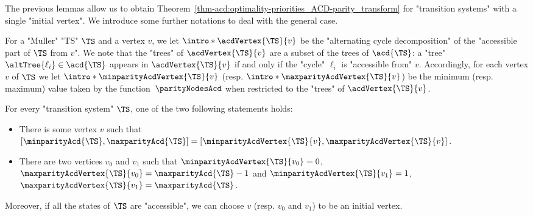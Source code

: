 \documentclass{theoretics}
\begin{document}
The previous lemmas allow us to obtain Theorem~\ref{thm-acd:optimality-priorities_ACD-parity_transform} for "transition systems" with a single "initial vertex". We introduce some further notations to deal with the general case.

\AP For a "Muller" "TS" $\TS$ and a vertex $v$, we let $\intro*\acdVertex{\TS}{v}$ be the "alternating cycle decomposition" of the "accessible part of $\TS$ from $v$". We note that the "trees" of $\acdVertex{\TS}{v}$ are a subset of the trees of $\acd{\TS}$: a "tree" $\altTree{\ell_i}\in \acd{\TS}$ appears in $\acdVertex{\TS}{v}$ if and only if the "cycle" $\ell_i$ is "accessible from" $v$.
\AP Accordingly, for each vertex $v$ of $\TS$ we let $\intro*\minparityAcdVertex{\TS}{v}$ (resp. $\intro*\maxparityAcdVertex{\TS}{v}$) be the minimum (resp. maximum) value taken by the function~$\parityNodesAcd$ when restricted to the "trees" of $\acdVertex{\TS}{v}$.

\begin{remark}\label{rmk-acd:priorities-accessible-from-vertex}
	For every "transition system" $\TS$, one of the two following statements holds:
	\begin{itemize}
		\item There is some vertex $v$ such that $[\minparityAcd{\TS}, \maxparityAcd{\TS}] = [\minparityAcdVertex{\TS}{v}, \maxparityAcdVertex{\TS}{v}]$.
		\item There are two vertices $v_0$ and $v_1$ such that $\minparityAcdVertex{\TS}{v_0}=0$, $\maxparityAcdVertex{\TS}{v_0} = \maxparityAcd{\TS}-1$ and $\minparityAcdVertex{\TS}{v_1}=1$, $\maxparityAcdVertex{\TS}{v_1} = \maxparityAcd{\TS}$.
	\end{itemize}
Moreover, if all the states of $\TS$ are "accessible", we can choose $v$ (resp. $v_0$ and $v_1$) to be an initial vertex.
\end{remark} 
\end{document}
